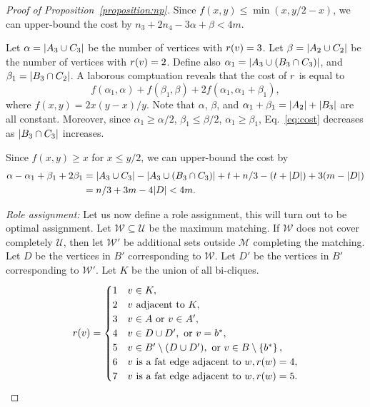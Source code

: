 \begin{proof}[Proof of Proposition~\ref{proposition:np}]
Since $f(x, y) \leq \min(x, y / 2 - x)$, we can upper-bound the cost
by $n_3 + 2n_4 - 3\alpha + \beta < 4m$.

\iffalse

Let $\alpha = {\left|A_3 \cup C_3\right|}$ be the number of vertices with $r(v) = 3$.
Let $\beta = {\left|A_2 \cup C_2\right|}$ be the number of vertices with $r(v) = 2$.
Define also $\alpha_1 = {\left|A_3 \cup (B_3 \cap C_3)\right|}$,
and $\beta_1 = {\left|B_3 \cap C_2\right|}$.
A laborous comptuation reveals that the cost of $r$ is equal to
\begin{equation}
\label{eq:cost}
	f(\alpha_1, \alpha) + f(\beta_1, \beta) + 2f(\alpha_1, \alpha_1 + \beta_1),
\end{equation}
where $f(x, y) = 2x(y - x)/y$.
Note that $\alpha$, $\beta$, and $\alpha_1 + \beta_1 = {\left|A_2\right|} + {\left|B_3\right|}$ are all constant.
Moreover, since
$\alpha_1 \geq \alpha / 2$,
$\beta_1 \leq \beta / 2$,
$\alpha_1 \geq \beta_1$, Eq.~\ref{eq:cost} decreases as ${\left|B_3 \cap C_3\right|}$ increases.

Since $f(x, y) \geq x$ for $x \leq y / 2$,
we can upper-bound the cost by
\[
\begin{split}
	\alpha - \alpha_1 + \beta_1 + 2\beta_1 & = {\left|A_3 \cup C_3\right|} - {\left|A_3 \cup (B_3 \cap C_3)\right|} + 
	t + n / 3 - (t + {\left|D\right|}) + 3(m - {\left|D\right|}) \\
	& = n / 3 + 3m - 4{\left|D\right|} < 4m.
\end{split}
\]

\emph{Role assignment:}
Let us now define a role assignment, this will turn out to be optimal
assignment.  Let $\mathcal{W} \subseteq \mathcal{U}$ be the maximum matching.
If $\mathcal{W}$ does not cover completely $\mathcal{U}$, then let $\mathcal{W}'$
be additional sets outside $\mathcal{M}$ completing the matching.
Let $D$ be the vertices in $B'$ corresponding to $\mathcal{W}$.
Let $D'$ be the vertices in $B'$ corresponding to $\mathcal{W}'$.
Let $K$ be the union of all bi-cliques.
\[
	r(v) =
\begin{cases}
1 & v \in K,\\
2 & v \text{ adjacent to } K,\\
3 & v \in A \text{ or } v \in A',\\
4 & v \in D \cup D', \text{ or } v = b^*, \\
5 & v \in B' \setminus (D \cup D'), \text{ or } v \in B \setminus \left\{b^*\right\},\\
6 & v \text{ is a fat edge adjacent to } w, r(w) = 4,\\
7 & v \text{ is a fat edge adjacent to } w, r(w) = 5.\\
\end{cases}
\]


\end{proof}
